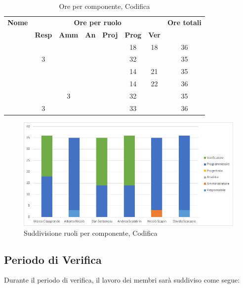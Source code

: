 \begin{table}[H]
	\begin{center}
		\begin{tabular}{|c|c|c|c|c|c|c|c|}
			\hline
			\textbf{Nome} & \multicolumn{6}{c|}{\textbf{Ore per ruolo}} & \textbf{Ore totali} \\\cline{2-7}
			& \textbf{Resp} & \textbf{Amm} & \textbf{An} & \textbf{Proj} & \textbf{Prog} & \textbf{Ver} & \\
			\hline
			\MC			&		&		&		&		&	18	&	18	&	36	\\
			\hline
			\AN			&	3	&		&		&	 	&	32	&		& 	35	\\
			\hline
			\DAN		&		&		&		&		&	14	&	21	&	35	\\
			\hline
			\AS			&		&	 	&	 	&		&	14 	& 	22	&	36	\\
			\hline
			\NS 		&		&	3	&		&		&	32	& 		&	35	\\
			\hline
			\DS			& 	3	&		&		&		&	33	&		&	36	\\
			\hline
		\end{tabular}
	\end{center}
	\caption{Ore per componente, Codifica}
\end{table}

\begin{figure}[H]
	\centering
	\includegraphics[scale=0.6]{img/6-4.png}
	\caption{Suddivisione ruoli per componente, Codifica}
\end{figure}

\subsection{Periodo di Verifica}
Durante il periodo di verifica, il lavoro dei membri sarà suddiviso come segue:

